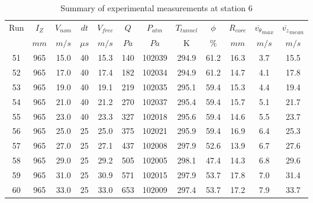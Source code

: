 \begin{table}[H]
\begin{center}
\begin{tabular}{|cccccccccccc|}
	\hline
	Run & $I_Z$ & $V_{nom}$ & $dt$ & $V_{free}$ & $Q$ & $P_{atm}$ & $T_{tunnel}$ & $\phi$ & $R_{core}$ & $\overline{v_{\theta}}_{max}$ & $\overline{v_{z}}_{mean}$\\
	  & $mm$ & $m/s$ & $\mu s$ & $m/s$ & $Pa$ & $Pa$ & K & $\%$ & $mm$ & $m/s$ & $m/s$\\
	\hline
	51 & 965 & 15.0 & 40 & 15.3 & 140 & 102039 & 294.9 & 61.2 & 16.3 & 3.7 & 15.5\\
	52 & 965 & 17.0 & 40 & 17.4 & 182 & 102034 & 294.9 & 61.2 & 14.7 & 4.1 & 17.8\\
	53 & 965 & 19.0 & 40 & 19.1 & 219 & 102035 & 295.1 & 59.4 & 15.3 & 4.4 & 19.4\\
	54 & 965 & 21.0 & 40 & 21.2 & 270 & 102037 & 295.4 & 59.4 & 15.7 & 5.1 & 21.7\\
	55 & 965 & 23.0 & 40 & 23.3 & 327 & 102018 & 295.6 & 59.4 & 14.6 & 5.5 & 23.7\\
	56 & 965 & 25.0 & 25 & 25.0 & 375 & 102021 & 295.9 & 59.4 & 16.9 & 6.4 & 25.3\\
	57 & 965 & 27.0 & 25 & 27.1 & 437 & 102008 & 297.9 & 52.6 & 13.9 & 6.7 & 27.6\\
	58 & 965 & 29.0 & 25 & 29.2 & 505 & 102005 & 298.1 & 47.4 & 14.3 & 6.8 & 29.6\\
	59 & 965 & 31.0 & 25 & 30.9 & 571 & 102015 & 297.9 & 53.7 & 17.8 & 7.0 & 31.4\\
	60 & 965 & 33.0 & 25 & 33.0 & 653 & 102009 & 297.4 & 53.7 & 17.2 & 7.9 & 33.7\\
	\hline
\end{tabular}
\caption{Summary of experimental measurements at station 6}
\label{table:experiment_results_6}
\end{center}
\end{table}
